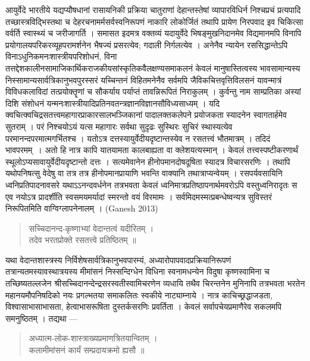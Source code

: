 {\dev आयुर्वेदे भारतीये यद्यप्यौषधानां रासायनिकी प्रक्रिया चातुराणां देहान्तस्तेषां व्यापारविधिर्न निश्चप्रचं प्रत्यपादि तच्छास्त्रविद्भिस्तथा च देहरचनामर्मसर्वस्वनिरूपणं नाकारि लोकोर्जितं तथापि प्रायेण निरपवाद इव चिकित्सा वर्वर्ति स्वास्थ्यं च जरीजागर्ति । समासत इदमत्र वक्तव्यं यदायुर्वेदे भिषङ्मुखनिदानमेव विद्यमानमपि विनापि प्रयोगालयपरिकरव्यूहपरामर्शनेन भैषज्यं प्रसरत्येव; गदाली निर्गलत्येव । अनेनैव न्यायेन रससिद्धान्तेऽपि विनाऽधुनिकमनः\-शास्त्रीयपरिशोधनं, विना तत्तद्देशकालीनसामाजिकार्थिकराजकीयसांस्कृतिकवैलक्षण्यसमा\-कलनं केवलं मानुषास्तित्वस्य भावसामान्यस्य निस्सामान्यसार्वत्रिकानुभवपुरस्सरं यच्चिन्तनं विहितमनेनैव सर्वमपि जैविकचित्तवृत्तिविलसनं यावन्मात्रं विविधकलाविदां तत्प्रयोक्तॄणां च सौकर्याय पर्याप्तं तावन्निरूपितं निराकुलम् । कुर्वन्तु नाम साम्प्रतिका अस्यां दिशि संशोधनं यन्मनःशास्त्रीयादिप्रतिनवतन्त्रज्ञानविज्ञानसौविध्यसाध्यम् । यदि क्वचित्क्वचिद्रसतत्त्वमहा\-गारप्राकारसालभञ्जिकानां पादालक्तकलेपने प्रयोजकता स्यादनेन स्वागतार्हमेव सुतराम् । परं निश्चयोऽयं यत्स महागारः सर्वथा सुदृढः सुस्थिरः सुचिरं स्थास्यत्येव परमानन्दपरमात्म\-गर्भितश्च । यतोऽत्र दत्तस्यायुर्वेदीयदृष्टान्तस्येव न रसतत्त्वं भौतमात्रम् । तदिदं भावपरमम्~। अतो हि नात्र कापि यातयामता कालबाह्यता वा क्लेशयत्यस्मान् । केवलं तत्त्वस्पष्टीकर\-णार्थं स्थूलोऽप्यसावायुर्वेदीयदृष्टान्तो दत्तः । सत्यमेवानेन हीनोपमानदोषदूषिता स्यादत्र विचार\-सरणिः । तथापि यथोपनिषत्सु वेदेषु वा तत्र तत्र हीनोपमानप्रायाणि भवन्ति वाक्यानि तथात्रा\-प्यन्वेयम् । रसपर्यवसायिनि ध्वनिप्रतिपादनावसरे यथाऽऽनन्दवर्धनेन तत्रभवता केवलं ध्वनि\-मात्रप्रतिष्ठापनार्थमवरोऽपि वस्तुध्वनिरादृतः स एव नयोऽत्र प्रादर्शीति स्वसमयमर्यादां स्मरन्तो वयं विरमामः । सर्वमिदमस्मत्प्रबन्धेष्वन्यत्र सुविस्तरं निरूपितमिति वाग्विग्लापनेनालम् ।} (Ganesh 2013) 
\begin{quote}
{\dev सच्चिदानन्द-कृष्णाभ्यां वेदान्तत्वं यदीरितम् ।}\\
{\dev तदेव भरतप्रोक्ते रसतत्त्वे प्रतिष्ठितम् ॥}
\end{quote}

{\dev यथा वेदान्तशास्त्रस्य निर्विशेषसार्वत्रिकानुभवपारम्यं, अध्यारोपापवादप्रक्रियानिरूपणं तत्रान्य\-तमस्यावस्थात्रयस्य मीमांसनं निस्सन्दिग्धेन विधिना स्वनामधन्येन विदुषा कृष्णस्वामिना च तच्छिष्यतल्लजेन श्रीसच्चिदानन्देन्द्रसरस्वतीस्वामिचरणेन व्यधायि तथैव चिरन्तनेन मुनिनापि तत्रभवता भरतेन महानयमौपनिषदिको नयः प्रगल्भतया समाकलितः स्वकीये नाट्याम्नाये । नात्र काचिच्छ्रद्धाजडता, विश्वासाभासाभासता, हेत्वाभासरूषिता दुस्तर्कसरणिः प्रवर्तिता । केवलं सर्वापचेयप्रमाणैरेव सकलमपि समनुष्ठितम् । तद्यथा ---} 
\begin{quote}
{\dev अध्यात्म-लोक-शास्त्राख्यप्रमाणत्रितयान्वितम् ।}\\
{\dev कलामीमांसनं कार्यं सम्प्रदायक्रमो ह्यसौ ॥}
\end{quote}

